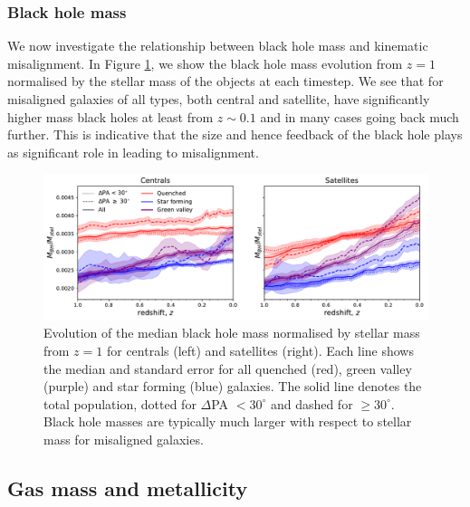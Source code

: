 \documentclass[fleqn,usenatbib]{mnras}
\begin{document}
\subsubsection{Black hole mass}
We now investigate the relationship between black hole mass and kinematic misalignment. In Figure \ref{fig:BH_mass}, we show the black hole mass evolution from $z = 1$ normalised by the stellar mass of the objects at each timestep. We see that for misaligned galaxies of all types, both central and satellite, have significantly higher mass black holes at least from $z \sim 0.1$ and in many cases going back much further. This is indicative that the size and hence feedback of the black hole plays as significant role in leading to misalignment. 

\begin{figure}
	\includegraphics[width=\linewidth]{tng_results/BH_mass_timestep_norm_cen_sat.pdf}
    \caption{Evolution of the median black hole mass normalised by stellar mass from $z=1$ for centrals (left) and satellites (right). Each line shows the median and standard error for all quenched (red), green valley (purple) and star forming (blue) galaxies. The solid line denotes the total population, dotted for $\Delta$PA $< 30^{\circ}$ and dashed for $\geq 30^{\circ}$. Black hole masses are typically much larger with respect to stellar mass for misaligned galaxies.}
    \label{fig:BH_mass}
\end{figure}

\subsection{Gas mass and metallicity}
\end{document}
